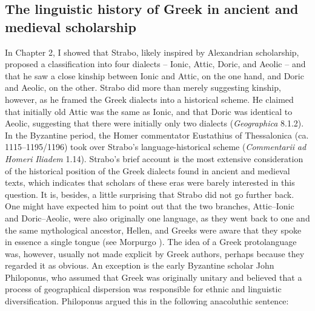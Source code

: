 \documentclass[output=paper]{langsci/langscibook}
\begin{document}
\subsection{The linguistic history of Greek in ancient and medieval scholarship}
\hypertarget{Toc19704835}{}
In Chapter 2, I showed that Strabo, likely inspired by Alexandrian scholarship, proposed a classification into four dialects – Ionic, Attic, Doric, and Aeolic – and that he saw a close kinship between Ionic and Attic, on the one hand, and Doric and Aeolic, on the other. Strabo did more than merely suggesting kinship, however, as he framed the Greek dialects into a historical scheme. He claimed that initially old Attic was the same as Ionic, and that Doric was identical to Aeolic, suggesting that there were initially only two dialects (\textit{Geographica} 8.1.2). In the Byzantine period, the Homer commentator Eustathius of Thessalonica (ca. 1115–1195/1196) took over Strabo’s language-historical scheme (\textit{Commentarii} \textit{ad} \textit{Homeri} \textit{Iliadem} 1.14). Strabo’s brief account is the most extensive consideration of the historical position of the Greek dialects found in ancient and medieval texts, which indicates that scholars of these eras were barely interested in this question. It is, besides, a little surprising that Strabo did not go further back. One might have expected him to point out that the two branches, Attic–Ionic and Doric–Aeolic, were also originally one language, as they went back to one and the same mythological ancestor, Hellen, and Greeks were aware that they spoke in essence a single tongue (see Morpurgo \citealt{Davies1987}). The idea of a Greek protolanguage was, however, usually not made explicit by Greek authors, perhaps because they regarded it as obvious. An exception is the early Byzantine scholar John Philoponus, who assumed that Greek was originally unitary and believed that a process of geographical dispersion was responsible for ethnic and linguistic diversification. Philoponus argued this in the following anacoluthic sentence:
\end{document}
